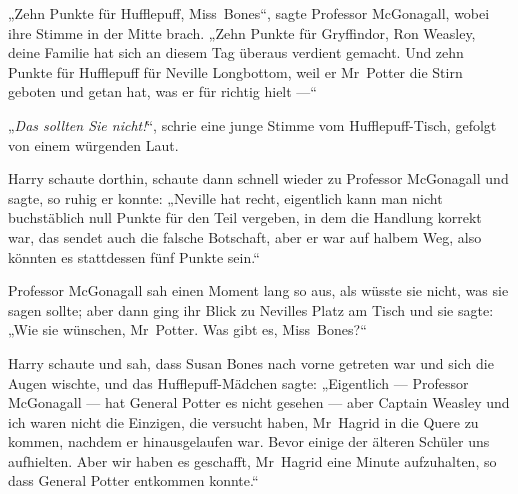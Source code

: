 „Zehn Punkte für Hufflepuff, Miss~Bones“, sagte Professor McGonagall, wobei ihre Stimme in der Mitte brach.
„Zehn Punkte für Gryffindor, Ron Weasley, deine Familie hat sich an diesem Tag überaus verdient gemacht. Und zehn Punkte für Hufflepuff für Neville Longbottom, weil er Mr~Potter die Stirn geboten und getan hat, was er für richtig hielt —“

„\emph{Das sollten Sie nicht!}“, schrie eine junge Stimme vom Hufflepuff-Tisch, gefolgt von einem würgenden Laut.

Harry schaute dorthin, schaute dann schnell wieder zu Professor McGonagall und sagte, so ruhig er konnte:
„Neville hat recht, eigentlich kann man nicht buchstäblich null Punkte für den Teil vergeben, in dem die Handlung korrekt war, das sendet auch die falsche Botschaft, aber er war auf halbem Weg, also könnten es stattdessen fünf Punkte sein.“

Professor McGonagall sah einen Moment lang so aus, als wüsste sie nicht, was sie sagen sollte; aber dann ging ihr Blick zu Nevilles Platz am Tisch und sie sagte:
„Wie sie wünschen, Mr~Potter. Was gibt es, Miss~Bones?“

Harry schaute und sah, dass Susan Bones nach vorne getreten war und sich die Augen wischte, und das Hufflepuff-Mädchen sagte:
„Eigentlich — Professor McGonagall — hat General Potter es nicht gesehen — aber Captain Weasley und ich waren nicht die Einzigen, die versucht haben, Mr~Hagrid in die Quere zu kommen, nachdem er hinausgelaufen war. Bevor einige der älteren Schüler uns aufhielten. Aber wir haben es geschafft, Mr~Hagrid eine Minute aufzuhalten, so dass General Potter entkommen konnte.“

